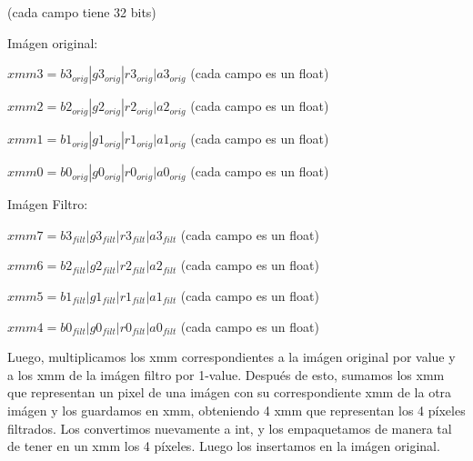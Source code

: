 \documentclass[a4paper]{article}
\begin{document}
(cada campo tiene 32 bits)

Imágen original:

\vspace*{0.3cm}

$xmm3 = b3_{orig} | g3_{orig} | r3_{orig} | a3_{orig}$   (cada campo es un float)

\vspace*{0.3cm}

$xmm2 = b2_{orig} | g2_{orig} | r2_{orig} | a2_{orig}$   (cada campo es un float)

\vspace*{0.3cm}

$xmm1 = b1_{orig} | g1_{orig} | r1_{orig} | a1_{orig}$   (cada campo es un float)

\vspace*{0.3cm}

$xmm0 = b0_{orig} | g0_{orig} | r0_{orig} | a0_{orig}$   (cada campo es un float)

\vspace*{0.3cm}

Imágen Filtro:

\vspace*{0.3cm}

$xmm7 = b3_{filt} | g3_{filt} | r3_{filt} | a3_{filt}$   (cada campo es un float)

\vspace*{0.3cm}

$xmm6 = b2_{filt} | g2_{filt} | r2_{filt} | a2_{filt}$   (cada campo es un float)

\vspace*{0.3cm}

$xmm5 = b1_{filt} | g1_{filt} | r1_{filt} | a1_{filt}$   (cada campo es un float)

\vspace*{0.3cm}

$xmm4 = b0_{filt} | g0_{filt} | r0_{filt} | a0_{filt}$   (cada campo es un float)

\vspace*{0.3cm}

Luego, multiplicamos los xmm correspondientes a la imágen original por value y a los xmm de la imágen filtro por 1-value. Después de esto, sumamos los xmm que representan un pixel de una imágen con su correspondiente xmm de la otra imágen y los guardamos en xmm, obteniendo 4 xmm que representan los 4 píxeles filtrados. Los convertimos nuevamente a int, y los empaquetamos de manera tal de tener en un xmm los 4 píxeles. Luego los insertamos en la imágen original.
\end{document}
